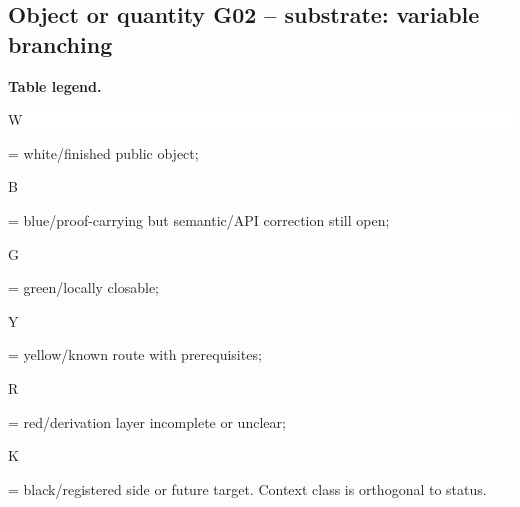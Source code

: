 \subsection*{Object or quantity G02 -- substrate: variable branching}
\hypertarget{objproof:G02}{}
\par\smallskip\noindent\begin{minipage}{0.99\linewidth}\footnotesize\raggedright\textbf{Table legend.} \colorbox{white}{\strut W} = white/finished public object; \colorbox{cyan!20}{\strut B} = blue/proof-carrying but semantic/API correction still open; \colorbox{green!18}{\strut G} = green/locally closable; \colorbox{yellow!25}{\strut Y} = yellow/known route with prerequisites; \colorbox{red!20}{\strut R} = red/derivation layer incomplete or unclear; \colorbox{black!18}{\strut K} = black/registered side or future target. Context class is orthogonal to status.\end{minipage}\par\vspace{0.25em}
